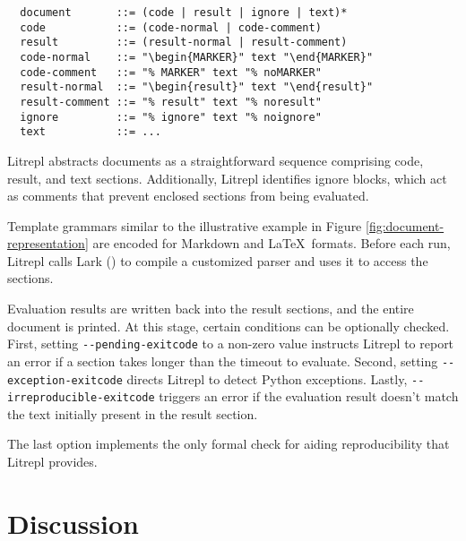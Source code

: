 \documentclass[letterpaper,12pt,twocolumn]{article}
\newcommand{\Latex}{\LaTeX\ }
\begin{document}
\begin{figure*}[hbt!]
  \centering
  \begin{minipage}{\textwidth}
  \begin{verbatim}
  document       ::= (code | result | ignore | text)*
  code           ::= (code-normal | code-comment)
  result         ::= (result-normal | result-comment)
  code-normal    ::= "\begin{MARKER}" text "\end{MARKER}"
  code-comment   ::= "% MARKER" text "% noMARKER"
  result-normal  ::= "\begin{result}" text "\end{result}"
  result-comment ::= "% result" text "% noresult"
  ignore         ::= "% ignore" text "% noignore"
  text           ::= ...
  \end{verbatim}
  \end{minipage}
  \caption{An illustrative grammar template for \Latex documents where marker
  serves as a parameter configured via command-line arguments for each supported
  interpreter class.}
  \label{fig:document-representation}
\end{figure*}

Litrepl abstracts documents as a straightforward sequence comprising code,
result, and text sections. Additionally, Litrepl identifies ignore blocks, which
act as comments that prevent enclosed sections from being evaluated.

Template grammars similar to the illustrative example in Figure
\ref{fig:document-representation} are encoded for Markdown and \Latex formats.
Before each run, Litrepl calls Lark (\textcite{Lark}) to compile a customized
parser and uses it to access the sections.

Evaluation results are written back into the result sections, and the entire
document is printed. At this stage, certain conditions can be optionally
checked. First, setting \verb|--pending-exitcode| to a non-zero value instructs
Litrepl to report an error if a section takes longer than the timeout to
evaluate. Second, setting \verb|--exception-exitcode| directs Litrepl to detect
Python exceptions. Lastly, \verb|--irreproducible-exitcode| triggers an error if
the evaluation result doesn't match the text initially present in the result
section.

The last option implements the only formal check for aiding reproducibility that
Litrepl provides.

\section{Discussion}
\end{document}
